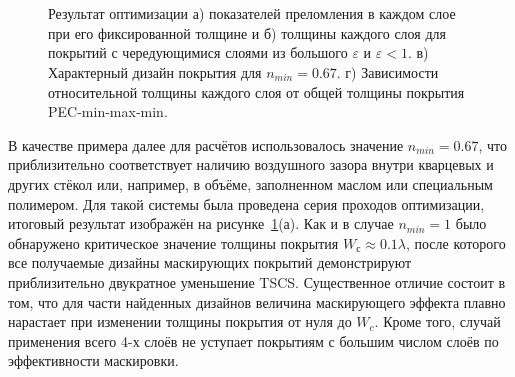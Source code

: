 \begin{figure}[p]
  \begin{minipage}{\linewidth}
  \begin{minipage}{0.49\linewidth}
  \end{minipage}
  \hfill
  \begin{minipage}{0.49\linewidth}
  \end{minipage}
  \end{minipage}\\
  \vspace*{4ex}%
  \\
  \begin{minipage}{\linewidth}
  \begin{minipage}{0.49\linewidth}
  \end{minipage}
  \hfill
  \begin{minipage}{0.49\linewidth}
  \end{minipage}
  \end{minipage}
  \caption{Результат оптимизации а) показателей преломления в каждом
    слое при его фиксированной толщине и б) толщины каждого слоя для
    покрытий с чередующимися слоями из большого $\varepsilon$ и
    ${\varepsilon<1}$. в) Характерный дизайн покрытия для
    $n_{min} = 0.67$. г) Зависимости относительной толщины каждого
    слоя от общей толщины покрытия PEC-min-max-min. }
  \label{img:min-max-min}  
\end{figure}

В качестве примера далее для расчётов использовалось значение
$n_{min}=0.67$, что приблизительно соответствует наличию воздушного
зазора внутри кварцевых и других стёкол или, например, в объёме,
заполненном маслом или специальным полимером.  Для такой системы была
проведена серия проходов оптимизации, итоговый результат изображён на
рисунке~\ref{img:min-max-min}(а). Как и в случае $n_{min}=1$ было
обнаружено критическое значение толщины покрытия
$W_с\approx 0.1\lambda$, после которого все получаемые дизайны
маскирующих покрытий демонстрируют приблизительно двукратное
уменьшение TSCS. Существенное отличие состоит в том, что для части
найденных дизайнов величина маскирующего эффекта плавно нарастает при
изменении толщины покрытия от нуля до $W_c$. Кроме того, случай применения
всего 4-х слоёв не уступает покрытиям с большим числом слоёв по
эффективности маскировки.

